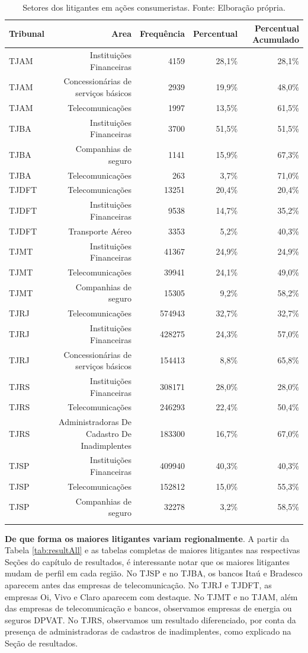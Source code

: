 \documentclass[]{report}
\begin{document}
\begin{longtable}{lrrrr}
\caption{Setores dos litigantes em ações consumeristas. Fonte: Elboração própria.} \\
  \hline
Tribunal & Area & Frequência & Percentual & Percentual Acumulado \\
  \hline
TJAM & Instituições
Financeiras & 4159 & 28,1\% & 28,1\% \\
  TJAM & Concessionárias
de serviços
básicos & 2939 & 19,9\% & 48,0\% \\
  TJAM & Telecomunicações & 1997 & 13,5\% & 61,5\% \\
  TJBA & Instituições
Financeiras & 3700 & 51,5\% & 51,5\% \\
  TJBA & Companhias de
seguro & 1141 & 15,9\% & 67,3\% \\
  TJBA & Telecomunicações & 263 & 3,7\% & 71,0\% \\
  TJDFT & Telecomunicações & 13251 & 20,4\% & 20,4\% \\
  TJDFT & Instituições
Financeiras & 9538 & 14,7\% & 35,2\% \\
  TJDFT & Transporte
Aéreo & 3353 & 5,2\% & 40,3\% \\
  TJMT & Instituições
Financeiras & 41367 & 24,9\% & 24,9\% \\
  TJMT & Telecomunicações & 39941 & 24,1\% & 49,0\% \\
  TJMT & Companhias de
seguro & 15305 & 9,2\% & 58,2\% \\
  TJRJ & Telecomunicações & 574943 & 32,7\% & 32,7\% \\
  TJRJ & Instituições
Financeiras & 428275 & 24,3\% & 57,0\% \\
  TJRJ & Concessionárias
de serviços
básicos & 154413 & 8,8\% & 65,8\% \\
  TJRS & Instituições
Financeiras & 308171 & 28,0\% & 28,0\% \\
  TJRS & Telecomunicações & 246293 & 22,4\% & 50,4\% \\
  TJRS & Administradoras
De Cadastro De
Inadimplentes & 183300 & 16,7\% & 67,0\% \\
  TJSP & Instituições
Financeiras & 409940 & 40,3\% & 40,3\% \\
  TJSP & Telecomunicações & 152812 & 15,0\% & 55,3\% \\
  TJSP & Companhias de
seguro & 32278 & 3,2\% & 58,5\% \\
   \hline
\hline
\label{unnamed-chunk-103}
\end{longtable}

\textbf{De que forma os maiores litigantes variam regionalmente}. A
partir da Tabela \ref{tab:resultAll} e as tabelas completas de maiores
litigantes nas respectivas Seções do capítulo de resultados, é
interessante notar que os maiores litigantes mudam de perfil em cada
região. No TJSP e no TJBA, os bancos Itaú e Bradesco aparecem antes das
empresas de telecomunicação. No TJRJ e TJDFT, as empresas Oi, Vivo e
Claro aparecem com destaque. No TJMT e no TJAM, além das empresas de
telecomunicação e bancos, observamos empresas de energia ou seguros
DPVAT. No TJRS, observamos um resultado diferenciado, por conta da
presença de administradoras de cadastros de inadimplentes, como
explicado na Seção de resultados.
\end{document}
